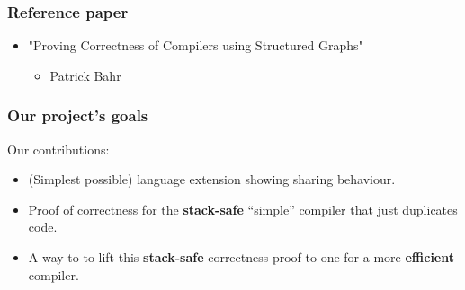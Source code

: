         \begin{frame}
            \frametitle{Reference paper}

            \begin{itemize}
                \item "Proving Correctness of Compilers using Structured Graphs"
                    \begin{itemize}
                        \item Patrick Bahr
                    \end{itemize}
            \end{itemize}
        \end{frame}

        \begin{frame}
            \frametitle{Our project's goals}


            Our contributions:
            \begin{itemize}
                \item (Simplest possible) language extension showing sharing behaviour.
                \item Proof of correctness for the \textbf{stack-safe} ``simple'' compiler that just duplicates code.
                \item A way to to lift this \textbf{stack-safe} correctness proof to one for a more \textbf{efficient} compiler.
            \end{itemize}
        \end{frame}
